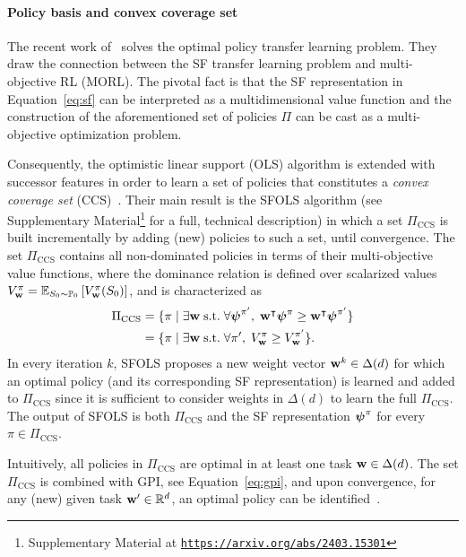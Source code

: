 \paragraph{Policy basis and convex coverage set} The recent work of~\citep{Alegre2022} solves the optimal policy transfer learning problem. They draw the connection between the SF transfer learning problem and multi-objective RL (MORL). The pivotal fact is that the SF representation in Equation~\eqref{eq:sf} can be interpreted as a multidimensional value function and the construction of the aforementioned set of policies $\Pi$ can be cast as a multi-objective optimization problem.
 
 Consequently, the optimistic linear support (OLS) algorithm is extended with successor features in order to learn a set of policies that constitutes a \textit{convex coverage set} (CCS)~\citep{Roijers2015}. Their main result is the SFOLS algorithm (see Supplementary Material\footnote{Supplementary Material at {\texttt{\url{https://arxiv.org/abs/2403.15301}}}} for a full, technical description) in which a set $\Pi_\text{CCS}$ is built incrementally by adding (new) policies to such a set, until convergence. The set $\Pi_\text{CCS}$ contains all non-dominated policies in terms of their multi-objective value functions, where the dominance relation is defined over scalarized values ${V^\pi_{\mathbf{w}} = \mathbb{E}_{S_0\sim\mathbb{P}_0}\left[V^\pi_{\mathbf{w}}(S_0)\right]}$, and is characterized as
\begin{align}
  \Pi_\text{CCS} &= \{\pi\;\lvert\;\exists\mathbf{w}\;\text{s.t.}\;\forall {\boldsymbol{\mathbf{\psi}}}^{\pi'},\; \mathbf{w}^\intercal {\boldsymbol{\mathbf{\psi}}}^\pi {\;\geq\;} \mathbf{w}^\intercal{\boldsymbol{\mathbf{\psi}}}^{\pi'} \} \nonumber\\
  &= \{ \pi \;\lvert\;\exists\mathbf{w}\;\text{s.t.}\;\forall {\pi'},\; {V^\pi_{\mathbf{w}}}{\;\geq\;} {V^{\pi'}_{\mathbf{w}}}\}.
\end{align} 
In every iteration $k$, SFOLS proposes a new weight vector $\mathbf{w}^k\in\Delta(d)$ for which an optimal policy (and its corresponding SF representation) is learned and added to $\Pi_\text{CCS}$ since it is sufficient to consider weights in $\Delta(d)$ to learn the full $\Pi_\text{CCS}$. The output of SFOLS is both $\Pi_\text{CCS}$ and the SF representation $\boldsymbol{\mathbf{\psi}}^\pi$ for every $\pi\in\Pi_\text{CCS}$.
 
Intuitively, all policies in $\Pi_\text{CCS}$ are optimal in at least one task $\mathbf{w} \in \Delta(d)$.
The set $\Pi_\text{CCS}$ is combined with GPI, see Equation~\eqref{eq:gpi}, and upon convergence, for any (new) given task $\mathbf{w}'\in\mathbb{R}^d$, an optimal policy can be identified~\citep[cf. Theorem 2]{Alegre2022}.


